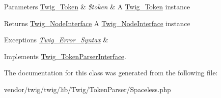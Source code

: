\begin{DoxyParams}[1]{Parameters}
\hyperlink{classTwig__Token}{Twig\+\_\+\+Token} & {\em \$token} & A \hyperlink{classTwig__Token}{Twig\+\_\+\+Token} instance\\
\hline
\end{DoxyParams}
\begin{DoxyReturn}{Returns}
\hyperlink{interfaceTwig__NodeInterface}{Twig\+\_\+\+Node\+Interface} A \hyperlink{interfaceTwig__NodeInterface}{Twig\+\_\+\+Node\+Interface} instance
\end{DoxyReturn}

\begin{DoxyExceptions}{Exceptions}
{\em \hyperlink{classTwig__Error__Syntax}{Twig\+\_\+\+Error\+\_\+\+Syntax}} & \\
\hline
\end{DoxyExceptions}


Implements \hyperlink{interfaceTwig__TokenParserInterface_a9d003ebcca4a13c6f36b86e79815e823}{Twig\+\_\+\+Token\+Parser\+Interface}.



The documentation for this class was generated from the following file\+:\begin{DoxyCompactItemize}
\item 
vendor/twig/twig/lib/\+Twig/\+Token\+Parser/Spaceless.\+php\end{DoxyCompactItemize}
